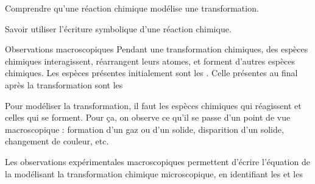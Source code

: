 \teteSndChim

\vspace*{-40pt}

\begin{objectifs}
  \item Comprendre qu'une réaction chimique modélise une transformation.
  \item Savoir utiliser l'écriture symbolique d'une réaction chimique.
\end{objectifs}

  


\begin{doc}{Observations macroscopiques}
  Pendant une transformation chimiques, des espèces chimiques interagissent, réarrangent leurs atomes, et forment d'autres espèces chimiques.
  Les espèces présentes initialement sont les . Celle présentes au final après la transformation sont les 
  
  Pour modéliser la transformation, il faut  les espèces chimiques qui réagissent et celles qui se forment.
  Pour ça, on observe ce qu'il se passe d'un point de vue macroscopique : formation d'un gaz ou d'un solide, disparition d'un solide, changement de couleur, etc.
  
  \begin{encart}
    Les observations expérimentales macroscopiques permettent d'écrire l'équation de la  modélisant la transformation chimique microscopique, en identifiant les  et les 
  \end{encart}
\end{doc}

